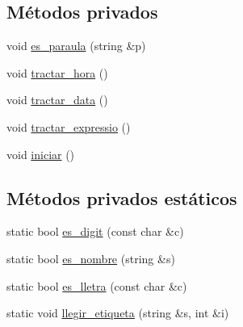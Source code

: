 \subsection*{Métodos privados}
\begin{DoxyCompactItemize}
\item 
void \hyperlink{class_token_a8b4b59b918158b7eb767e5f78730bb3f}{es\-\_\-paraula} (string \&p)
\item 
void \hyperlink{class_token_a37eb2cacee3a373bff5794e0eeffe7b4}{tractar\-\_\-hora} ()
\item 
void \hyperlink{class_token_a6caad8c345876742de8ee08fc9a13910}{tractar\-\_\-data} ()
\item 
void \hyperlink{class_token_abcc042ca3e95feefac091792ee526fc2}{tractar\-\_\-expressio} ()
\item 
void \hyperlink{class_token_a8115f6d5917bd05f7cd568622318af24}{iniciar} ()
\end{DoxyCompactItemize}
\subsection*{Métodos privados estáticos}
\begin{DoxyCompactItemize}
\item 
static bool \hyperlink{class_token_a128f20b69704c51c86490a96c3d49084}{es\-\_\-digit} (const char \&c)
\item 
static bool \hyperlink{class_token_a93569340aa393358e31205fbb57f7978}{es\-\_\-nombre} (string \&s)
\item 
static bool \hyperlink{class_token_a29e03315052975e392b62f78f026fb41}{es\-\_\-lletra} (const char \&c)
\item 
static void \hyperlink{class_token_a4910b5b17b9398996a51a8ad9193420c}{llegir\-\_\-etiqueta} (string \&s, int \&i)
\end{DoxyCompactItemize}
